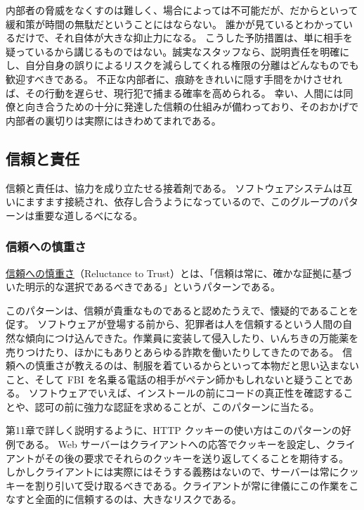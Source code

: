 \documentclass[uplatex]{jsarticle}
\def\label#1{}%
\begin{document}
内部者の脅威をなくすのは難しく、場合によっては不可能だが、だからといって緩和策が時間の無駄だということにはならない。
誰かが見ているとわかっているだけで、それ自体が大きな抑止力になる。
こうした予防措置は、単に相手を疑っているから講じるものではない。誠実なスタッフなら、説明責任を明確にし、自分自身の誤りによるリスクを減らしてくれる権限の分離はどんなものでも歓迎すべきである。
不正な内部者に、痕跡をきれいに隠す手間をかけさせれば、その行動を遅らせ、現行犯で捕まる確率を高められる。
幸い、人間には同僚と向き合うための十分に発達した信頼の仕組みが備わっており、そのおかげで内部者の裏切りは実際にはきわめてまれである。

\subsection{信頼と責任}

信頼と責任は、協力を成り立たせる接着剤である。
ソフトウェアシステムは互いにますます接続され、依存し合うようになっているので、このグループのパターンは重要な道しるべになる。

\subsubsection{信頼への慎重さ}

\begin{dfn}[信頼への慎重さ]\label{dfn:ch4-reluctance-to-trust}
\underline{信頼への慎重さ}（Reluctance to Trust）とは、「信頼は常に、確かな証拠に基づいた明示的な選択であるべきである」というパターンである。
\end{dfn}

このパターンは、信頼が貴重なものであると認めたうえで、懐疑的であることを促す。
ソフトウェアが登場する前から、犯罪者は人を信頼するという人間の自然な傾向につけ込んできた。作業員に変装して侵入したり、いんちきの万能薬を売りつけたり、ほかにもありとあらゆる詐欺を働いたりしてきたのである。
信頼への慎重さが教えるのは、制服を着ているからといって本物だと思い込まないこと、そして FBI を名乗る電話の相手がペテン師かもしれないと疑うことである。
ソフトウェアでいえば、インストールの前にコードの真正性を確認することや、認可の前に強力な認証を求めることが、このパターンに当たる。

\begin{exa}\label{exa:ch4-http-cookies}
第11章で詳しく説明するように、HTTP クッキーの使い方はこのパターンの好例である。
Web サーバーはクライアントへの応答でクッキーを設定し、クライアントがその後の要求でそれらのクッキーを送り返してくることを期待する。
しかしクライアントには実際にはそうする義務はないので、サーバーは常にクッキーを割り引いて受け取るべきである。クライアントが常に律儀にこの作業をこなすと全面的に信頼するのは、大きなリスクである。
\end{exa}
\end{document}
